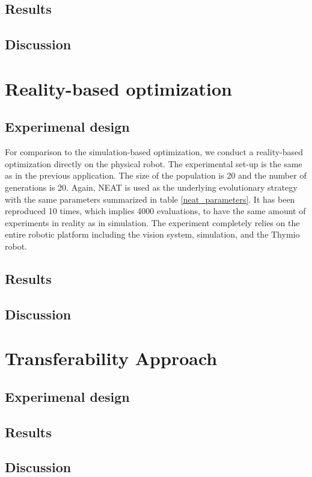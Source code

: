 \subsection{Results}

\subsection{Discussion}

\section{Reality-based optimization}

\subsection{Experimenal design}

For comparison to the simulation-based optimization, we conduct a reality-based optimization directly on the physical robot. The experimental set-up is the same as in the previous application. The size of the population is 20 and the number of generations is 20. Again, NEAT is used as the underlying evolutionary strategy with the same parameters summarized in table \ref{neat_parameters}. It has been reproduced 10 times, which implies 4000 evaluations, to have the same amount of experiments in reality as in simulation. The experiment completely relies on the entire robotic platform including the vision system, simulation, and the Thymio robot.

\subsection{Results}

\subsection{Discussion}

\section{Transferability Approach}

\subsection{Experimenal design}

\subsection{Results}

\subsection{Discussion}



